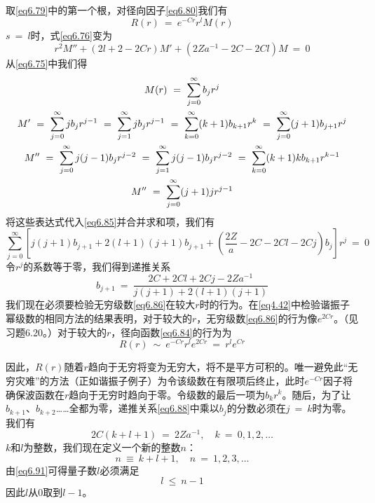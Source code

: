 \documentclass[12pt,a4paper,openany]{ctexbook}
\begin{document}
\begin{flushleft}
取\eqref{eq6.79}中的第一个根，对径向因子\eqref{eq6.80}我们有
\begin{equation}
    R(r)\ =\ e^{-Cr}r^lM(r) \label{eq6.84}
\end{equation}
$s\ =\ l$时，式\eqref{eq6.76}变为
\begin{equation}
    r^2M''+(2l+2-2Cr)M'+(2Za^{-1}-2C-2Cl)M\ =\ 0 \label{eq6.85}
\end{equation}
从\eqref{eq6.75}中我们得
\begin{gather}
    M(r)\ =\ \sum_{j=0}^{\infty}b_jr^j \label{eq6.86} \\
    M'\ =\ \sum_{j=0}^{\infty}jb_jr^{j-1}\ =\ \sum_{j=1}^{\infty}jb_jr^{j-1}\ =\ \sum_{k=0}^{\infty}(k+1)b_{k+1}r^k\ =\ \sum_{j=0}^{\infty}(j+1)b_{j+1}r^j \notag \\
    M''\ =\ \sum_{j=0}^{\infty}j(j-1)b_jr^{j-2}\ =\ \sum_{j=1}^{\infty}j(j-1)b_jr^{j-2}\ =\ \sum_{k=0}^{\infty}(k+1)kb_{k+1}r^{k-1} \notag \\
    M''\ =\ \sum_{j=0}^{\infty}(j+1)jr^{j-1} \label{eq6.87}
\end{gather}
将这些表达式代入\eqref{eq6.85}并合并求和项，我们有
\begin{equation*}
    \sum_{j=0}^{\infty}\left[j(j+1)b_{j+1}+2(l+1)(j+1)b_{j+1}+(\frac{2Z}{a}-2C-2Cl-2Cj)b_j\right]r^j\ =\ 0
\end{equation*}
令$r^j$的系数等于零，我们得到递推关系
\begin{equation}
    b_{j+1}\ =\ \frac{2C+2Cl+2Cj-2Za^{-1}}{j(j+1)+2(l+1)(j+1)} \label{eq6.88}
\end{equation}
我们现在必须要检验无穷级数\eqref{eq6.86}在较大$r$时的行为。在\eqref{eq4.42}中检验谐振子幂级数的相同方法的结果表明，对于较大的$r$，无穷级数\eqref{eq6.86}的行为像$e^{2Cr}$。（见习题6.20。）对于较大的$r$，径向函数\eqref{eq6.84}的行为为
\begin{equation}
    R(r)\ \sim\ e^{-Cr}r^le^{2Cr}\ =\ r^le^{Cr} \label{eq6.89}
\end{equation}

因此，$R(r)$随着$r$趋向于无穷将变为无穷大，将不是平方可积的。唯一避免此“无穷灾难”的方法（正如谐振子例子）为令该级数在有限项后终止，此时$e^{-Cr}$因子将确保波函数在$r$趋向于无穷时趋向于零。令级数的最后一项为$b_kr^k$。随后，为了让$b_{k+1}$、$b_{k+2}$……全都为零，递推关系\eqref{eq6.88}中乘以$b_j$的分数必须在$j\ =\ k$时为零。我们有
\begin{equation}
    2C(k+l+1)\ =\ 2Za^{-1},\quad k\ =\ 0,1,2,\dots \label{eq6.90}
\end{equation}
$k$和$l$为整数，我们现在定义一个新的整数$n$：
\begin{equation}
    n\ \equiv\ k+l+1,\quad n\ =\ 1,2,3,\dots \label{eq6.91}
\end{equation}
由\eqref{eq6.91}可得量子数$l$必须满足
\begin{equation}
    l\ \leq\ n-1 \label{eq6.92}
\end{equation}
因此$l$从$0$取到$l-1$。
\end{flushleft}
\end{document}
